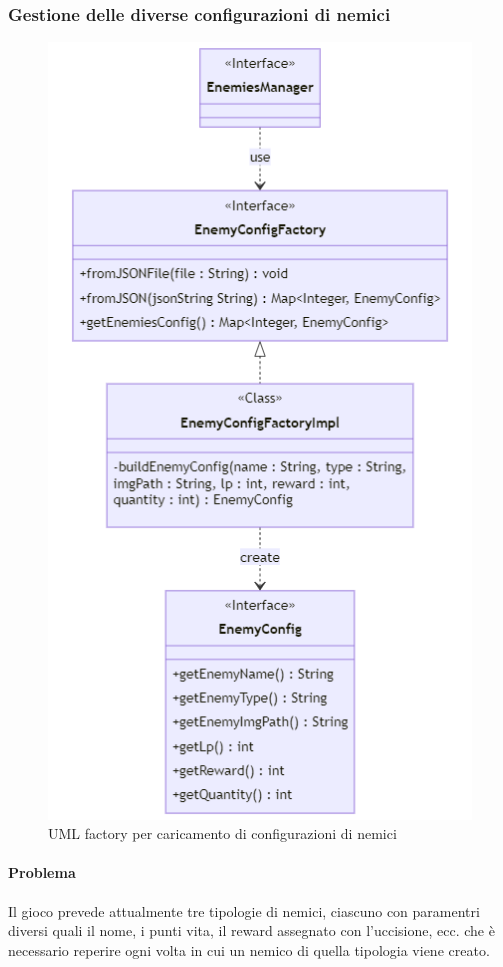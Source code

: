 \documentclass[a4paper,12pt]{report}
\begin{document}
\subsubsection{Gestione delle diverse configurazioni di nemici}
\begin{figure}[H]
    \centering
    \includegraphics[scale=0.8]{RelazioneTD/images/enemyConfigFactoryUML.png}
    \caption{UML factory per caricamento di configurazioni di nemici}
    \label{fig:enter-label}
\end{figure}

\paragraph{Problema} Il gioco prevede attualmente tre tipologie di nemici, ciascuno con paramentri diversi quali il nome, i punti vita, il reward assegnato con l'uccisione, ecc. che è necessario reperire ogni volta in cui un nemico di quella tipologia viene creato. 
\end{document}
